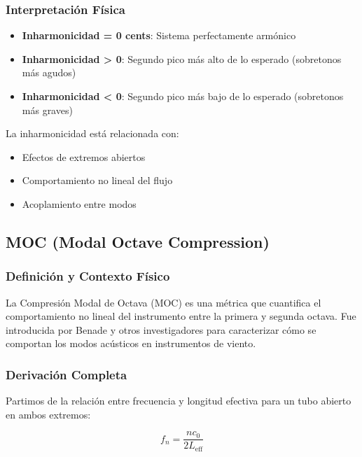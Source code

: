 \documentclass[12pt,a4paper,twocolumn]{article}
\begin{document}
\subsubsection{Interpretación Física}

\begin{itemize}
    \item \textbf{Inharmonicidad = 0 cents}: Sistema perfectamente armónico
    \item \textbf{Inharmonicidad > 0}: Segundo pico más alto de lo esperado (sobretonos más agudos)
    \item \textbf{Inharmonicidad < 0}: Segundo pico más bajo de lo esperado (sobretonos más graves)
\end{itemize}

La inharmonicidad está relacionada con:
\begin{itemize}
    \item Efectos de extremos abiertos
    \item Comportamiento no lineal del flujo
    \item Acoplamiento entre modos
\end{itemize}

\subsection{MOC (Modal Octave Compression)}

\subsubsection{Definición y Contexto Físico}

La Compresión Modal de Octava (MOC) es una métrica que cuantifica el comportamiento no lineal del instrumento entre la primera y segunda octava. Fue introducida por Benade y otros investigadores para caracterizar cómo se comportan los modos acústicos en instrumentos de viento.

\subsubsection{Derivación Completa}

Partimos de la relación entre frecuencia y longitud efectiva para un tubo abierto en ambos extremos:

\begin{equation}
f_n = \frac{n c_0}{2 L_{\text{eff}}}
\label{eq:frecuencia_tubo}
\end{equation}
\end{document}
